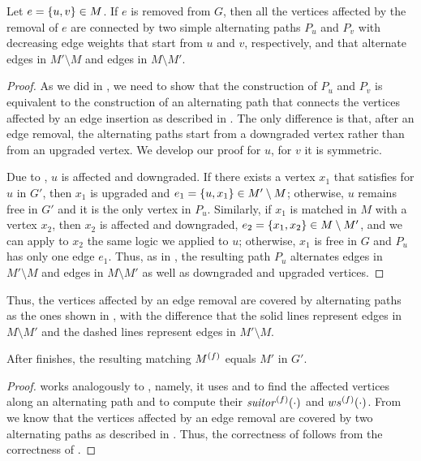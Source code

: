\begin{lemma}
\label{lemma:dyn-mwm:edge-removal-affected}
Let $e = \set{u, v} \in M$. If $e$ is removed from $G$, then all the vertices affected by
the removal of $e$ are connected by two simple alternating paths $P_u$ and $P_v$
with decreasing edge weights that start from $u$ and $v$, respectively, and that
alternate edges in $M'\setminus M$ and edges in $M\setminus M'$.
\end{lemma}

\begin{proof}
As we did in , we need to show that
the construction of $P_u$ and $P_v$ is equivalent to the construction of an
alternating path that connects the vertices affected by an edge insertion as
described in .
The only difference is that, after an edge removal, the alternating paths
start from a downgraded vertex rather than from an upgraded vertex.
We develop our proof \wilog for $u$, for $v$ it is symmetric.

Due to , $u$ is affected and
downgraded. If there exists a vertex $x_1$ that satisfies  for
$u$ in $G'$, then $x_1$ is upgraded and $e_1 = \set{u, x_1} \in M'\setminus
M$; otherwise, $u$ remains free in $G'$ and it is the only vertex in $P_u$.
Similarly, if $x_1$ is matched in $M$ with a vertex $x_2$, then $x_2$ is affected
and downgraded, $e_2 = \set{x_1, x_2} \in M \setminus M'$, and we can apply to
$x_2$ the same logic we applied to $u$; otherwise, $x_1$ is free in $G$ and
$P_u$ has only one edge $e_1$.
Thus, as in ,
the resulting path $P_u$ alternates edges in $M'\setminus M$ and edges in
$M\setminus M'$ as well as downgraded and upgraded vertices.
\end{proof}

Thus, the vertices affected by an edge removal are covered by alternating paths
as the ones shown in , with the difference
that the solid lines represent edges in $M\setminus M'$ and the dashed lines
represent edges in $M'\setminus M$.

\begin{proposition}
\label{prop:dyn-mwm:edge-removal-correct}
After  finishes, the resulting matching
$M^{(f)}$ equals $M'$ in $G'$.
\end{proposition}

\begin{proof}
 works analogously to ,
namely, it uses \findaff and \updateaff to find the affected vertices
along an alternating path and to compute their $\mathit{suitor}^{(f)}(\cdot)$ and
$ws^{(f)}(\cdot)$. From  we know that
the vertices affected by an edge removal are covered by two alternating paths
as described in .
Thus, the correctness of  follows from the
correctness of .
\end{proof}


